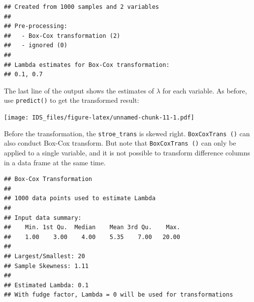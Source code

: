 \documentclass[12pt,]{krantz}
\makeatletter
\newenvironment{Shaded}{\begin{snugshade}}{\end{snugshade}}
\newcommand{\DataTypeTok}[1]{\textcolor[rgb]{0.27,0.27,0.27}{#1}}
\newcommand{\DecValTok}[1]{\textcolor[rgb]{0.06,0.06,0.06}{#1}}
\newcommand{\KeywordTok}[1]{\textcolor[rgb]{0.27,0.27,0.27}{\textbf{#1}}}
\newcommand{\NormalTok}[1]{#1}
\newcommand{\OperatorTok}[1]{\textcolor[rgb]{0.43,0.43,0.43}{\textbf{#1}}}
\newcommand{\StringTok}[1]{\textcolor[rgb]{0.5,0.5,0.5}{#1}}
\newenvironment{kframe}{%
\medskip{}
\setlength{\fboxsep}{.8em}
 \def\at@end@of@kframe{}%
 \ifinner\ifhmode%
  \def\at@end@of@kframe{\end{minipage}}%
  \begin{minipage}{\columnwidth}%
 \fi\fi%
 \def\FrameCommand##1{\hskip\@totalleftmargin \hskip-\fboxsep
 \colorbox{shadecolor}{##1}\hskip-\fboxsep
     \hskip-\linewidth \hskip-\@totalleftmargin \hskip\columnwidth}%
 \MakeFramed {\advance\hsize-\width
   \@totalleftmargin\z@ \linewidth\hsize
   \@setminipage}}%
 {\par\unskip\endMakeFramed%
 \at@end@of@kframe}
\renewenvironment{Shaded}{\begin{kframe}}{\end{kframe}}
\makeatother
\begin{document}
\begin{verbatim}
## Created from 1000 samples and 2 variables
## 
## Pre-processing:
##   - Box-Cox transformation (2)
##   - ignored (0)
## 
## Lambda estimates for Box-Cox transformation:
## 0.1, 0.7
\end{verbatim}

The last line of the output shows the estimates of \(\lambda\) for each variable. As before, use \texttt{predict()} to get the transformed result:

\begin{Shaded}
\end{Shaded}

\texttt{[image: IDS\_files/figure-latex/unnamed-chunk-11-1.pdf]}

Before the transformation, the \texttt{stroe\_trans} is skewed right.
\texttt{BoxCoxTrans\ ()} can also conduct Box-Cox transform. But note that \texttt{BoxCoxTrans\ ()} can only be applied to a single variable, and it is not possible to transform difference columns in a data frame at the same time.

\begin{Shaded}
\end{Shaded}

\begin{verbatim}
## Box-Cox Transformation
## 
## 1000 data points used to estimate Lambda
## 
## Input data summary:
##    Min. 1st Qu.  Median    Mean 3rd Qu.    Max. 
##    1.00    3.00    4.00    5.35    7.00   20.00 
## 
## Largest/Smallest: 20 
## Sample Skewness: 1.11 
## 
## Estimated Lambda: 0.1 
## With fudge factor, Lambda = 0 will be used for transformations
\end{verbatim}
\end{document}
